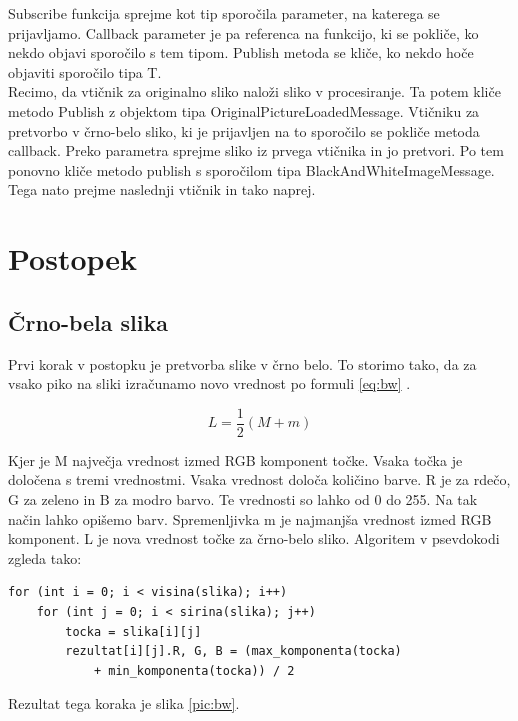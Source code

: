 \documentclass[oneside, a4paper, 12pt]{book}
\begin{document}
Subscribe funkcija sprejme kot tip sporočila parameter, na katerega se prijavljamo. Callback parameter je pa referenca na funkcijo, ki se pokliče, ko nekdo objavi sporočilo s tem tipom. Publish metoda se kliče, ko nekdo hoče objaviti sporočilo tipa T.\\
Recimo, da vtičnik za originalno sliko naloži sliko v procesiranje. Ta potem kliče metodo Publish z objektom tipa OriginalPictureLoadedMessage. Vtičniku za pretvorbo v črno-belo sliko, ki je prijavljen na to sporočilo se pokliče metoda callback. Preko parametra sprejme sliko iz prvega vtičnika in jo pretvori. Po tem ponovno kliče metodo publish s sporočilom tipa Black\-And\-White\-Image\-Message. Tega nato prejme naslednji vtičnik in tako naprej.

\section{Postopek}
\subsection{Črno-bela slika}
Prvi korak v postopku je pretvorba slike v črno belo. To storimo tako, da za vsako piko na sliki izračunamo novo vrednost po formuli \ref{eq:bw} \cite{LHS}.

\begin{equation}
L=\dfrac{1}{2}(M+m)
\label{eq:bw}
\end{equation}

Kjer je M največja vrednost izmed RGB \cite{RGB} komponent točke. Vsaka točka je določena s tremi vrednostmi. Vsaka vrednost določa količino barve. R je za rdečo, G za zeleno in B za modro barvo. Te vrednosti so lahko od 0 do 255. Na tak način lahko opišemo barv. Spremenljivka m je najmanjša vrednost izmed RGB komponent. L je nova vrednost točke za črno-belo sliko. Algoritem v psevdokodi zgleda tako:

\begin{verbatim}
for (int i = 0; i < visina(slika); i++)
    for (int j = 0; i < sirina(slika); j++)
	    tocka = slika[i][j]
	    rezultat[i][j].R, G, B = (max_komponenta(tocka) 
	        + min_komponenta(tocka)) / 2
\end{verbatim}


Rezultat tega koraka je slika \ref{pic:bw}.
\end{document}
